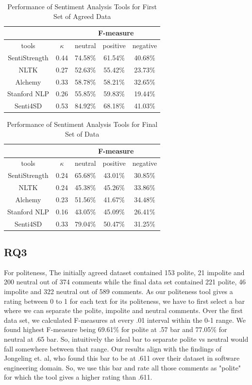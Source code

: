 \begin{table}
\centering
\caption{Performance of Sentiment Analysis Tools for First Set of  Agreed Data}
\label{sentfirst}
\begin{tabular}{|c|c|c|c|c|}
\hline
\multicolumn{2}{|c|}{ } & \multicolumn{3}{c|}{ F-measure } \\
\hline
tools & $\kappa$ & neutral & positive & negative \\
\hline
SentiStrength & 0.44 & 74.58\% & 61.54\% & 40.68\% \\
\hline
NLTK & 0.27 & 52.63\% & 55.42\% & 23.73\% \\
\hline
Alchemy & 0.33 & 58.78\% & 58.21\% & 32.65\% \\
\hline
Stanford NLP & 0.26 & 55.85\% & 59.83\% & 19.44\% \\
\hline
Senti4SD & 0.53 & 84.92\% & 68.18\% & 41.03\% \\
\hline
\end{tabular}
\end{table}

\begin{table}
\centering
\caption{Performance of Sentiment Analysis Tools for Final Set of Data}
\label{sentfinal}
\begin{tabular}{|c|c|c|c|c|}
\hline
\multicolumn{2}{|c|}{ } & \multicolumn{3}{c|}{ F-measure } \\
\hline
tools & $\kappa$ & neutral & positive & negative \\
\hline
SentiStrength & 0.24 & 65.68\% & 43.01\% & 30.85\% \\
\hline
NLTK & 0.24 & 45.38\% & 45.26\% & 33.86\% \\
\hline
Alchemy & 0.23 & 51.56\% & 41.67\% & 34.48\% \\
\hline
Stanford NLP & 0.16 & 43.05\% & 45.09\% & 26.41\% \\
\hline
Senti4SD & 0.33 & 79.04\% & 50.47\% &  31.25\% \\
\hline
\end{tabular}
\end{table}

\subsection{RQ3}

For politeness, The initially agreed dataset contained 153 polite, 21 impolite and 200 neutral out of 374 comments while the final data set contained 221 polite, 46 impolite and 322 neutral out of 589 comments. As our politeness tool gives a rating between 0 to 1 for each text for its politeness, we have to first select a bar where we can separate the polite, impolite and neutral comments. Over the first data set, we calculated F-measures at every .01 interval within the 0-1 range. We found highest F-measure being 69.61\%  for polite at .57 bar and 77.05\% for neutral at .65 bar. So, intuitively the ideal bar to separate polite vs neutral would fall somewhere between that range. Our results align with the findings of Jongeling et. al, who found this bar to be at .611 over their dataset in software engineering domain. So, we use this bar and rate all those comments as "polite" for which the tool gives a higher rating than .611.

